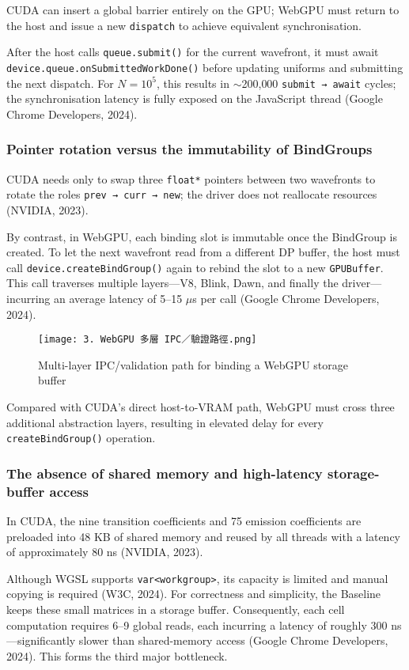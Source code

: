 \documentclass[PhD]{PHlab-thesis}
\begin{document}
CUDA can insert a global barrier entirely on the GPU; WebGPU must return to the host and issue a new \texttt{dispatch} to achieve equivalent synchronisation.

After the host calls \texttt{queue.submit()} for the current wavefront, it must await \texttt{device.queue.onSubmittedWorkDone()} before updating uniforms and submitting the next dispatch.  
For $N = 10^{5}$, this results in $\sim$200{,}000 \texttt{submit → await} cycles; the synchronisation latency is fully exposed on the JavaScript thread (Google Chrome Developers, 2024).

\subsubsection{Pointer rotation versus the immutability of BindGroups}
CUDA needs only to swap three \texttt{float*} pointers between two wavefronts to rotate the roles \texttt{prev → curr → new}; the driver does not reallocate resources (NVIDIA, 2023).

By contrast, in WebGPU, each binding slot is immutable once the BindGroup is created. To let the next wavefront read from a different DP buffer, the host must call \texttt{device.createBindGroup()} again to rebind the slot to a new \texttt{GPUBuffer}.  
This call traverses multiple layers—V8, Blink, Dawn, and finally the driver—incurring an average latency of 5–15 $\mu$s per call (Google Chrome Developers, 2024).

\begin{figure}[htbp]
    \centering
    \texttt{[image: 3. WebGPU 多層 IPC／驗證路徑.png]}
    \caption{Multi-layer IPC/validation path for binding a WebGPU storage buffer}
    \label{fig:webgpu-ipc-validation}
\end{figure}

Compared with CUDA's direct host-to-VRAM path, WebGPU must cross three additional abstraction layers, resulting in elevated delay for every \texttt{createBindGroup()} operation.

\subsubsection{The absence of shared memory and high-latency storage-buffer access}
In CUDA, the nine transition coefficients and 75 emission coefficients are preloaded into 48 KB of shared memory and reused by all threads with a latency of approximately 80 ns (NVIDIA, 2023).

Although WGSL supports \texttt{var<workgroup>}, its capacity is limited and manual copying is required (W3C, 2024).  
For correctness and simplicity, the Baseline keeps these small matrices in a storage buffer. Consequently, each cell computation requires 6–9 global reads, each incurring a latency of roughly 300 ns—significantly slower than shared-memory access (Google Chrome Developers, 2024). This forms the third major bottleneck.
\end{document}
